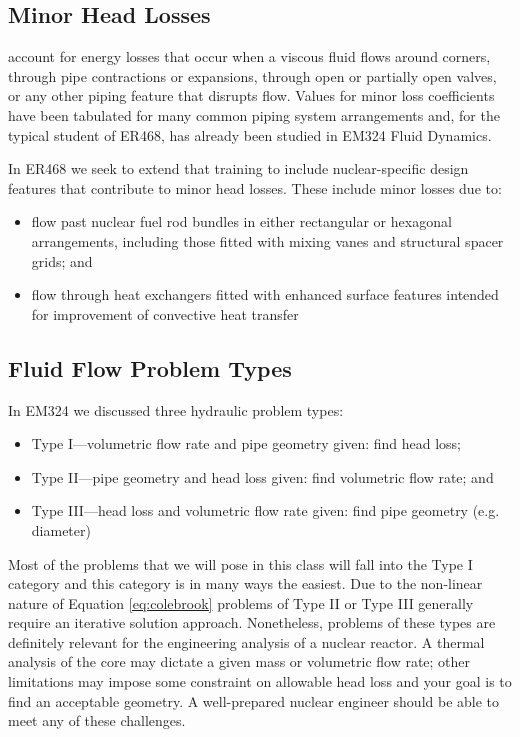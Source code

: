 \subsection{Minor Head Losses}
 account for energy losses that occur when a viscous fluid flows around corners, through pipe contractions or expansions, through open or partially open valves, or any other piping feature that disrupts flow. Values for minor loss coefficients have been tabulated for many common piping system arrangements and, for the typical student of ER468, has already been studied in EM324 Fluid Dynamics.  

In ER468 we seek to extend that training to include nuclear-specific design features that contribute to minor head losses.  These include minor losses due to:
\begin{itemize}
\item flow past nuclear fuel rod bundles in either rectangular or hexagonal arrangements, including those fitted with mixing vanes and structural spacer grids; and
\item flow through heat exchangers fitted with enhanced surface features intended for improvement of convective heat transfer 
\end{itemize}

\subsection{Fluid Flow Problem Types}

In EM324 we discussed three hydraulic problem types:
\begin{itemize}
\item Type I---volumetric flow rate and pipe geometry given: find head loss;
\item Type II---pipe geometry and head loss given: find volumetric flow rate; and
\item Type III---head loss and volumetric flow rate given: find pipe geometry (e.g. diameter)
\end{itemize}

Most of the problems that we will pose in this class will fall into the Type I category and this category is in many ways the easiest.  Due to the non-linear nature of Equation \ref{eq:colebrook} problems of Type II or Type III generally require an iterative solution approach.  Nonetheless, problems of these types are definitely relevant for the engineering analysis of a nuclear reactor.  A thermal analysis of the core may dictate a given mass or volumetric flow rate; other limitations may impose some constraint on allowable head loss and your goal is to find an acceptable geometry.  A well-prepared nuclear engineer should be able to meet any of these challenges.

